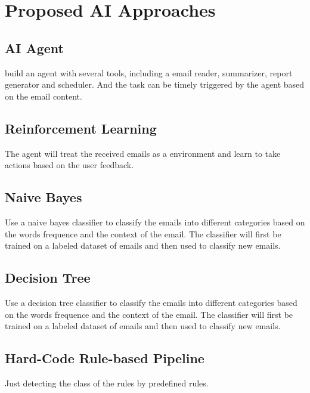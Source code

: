 \documentclass{article}
\begin{document}
\section{Proposed AI Approaches}

\subsection{AI Agent}
  build an agent with several tools, including a email reader, summarizer, report generator and scheduler.  And the task can be timely triggered by the agent based on the email content.

\subsection{Reinforcement Learning}
  The agent will treat the received emails as a environment and learn to take actions based on the user feedback.

\subsection{Naive Bayes}
  Use a naive bayes classifier to classify the emails into different categories based on the words frequence and the context of the email. The classifier will first be trained on a labeled dataset of emails and then used to classify new emails.

\subsection{Decision Tree}
  Use a decision tree classifier to classify the emails into different categories based on the words frequence and the context of the email. The classifier will first be trained on a labeled dataset of emails and then used to classify new emails.
\subsection{Hard-Code Rule-based Pipeline}
  Just detecting the class of the rules by predefined rules.
\end{document}
